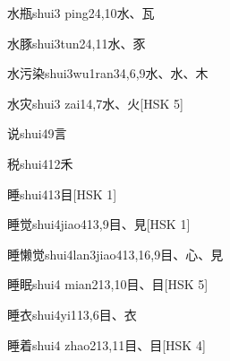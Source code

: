 \begin{entry}{水瓶}{shui3 ping2}{4,10}{⽔、⽡}
\end{entry}

\begin{entry}{水豚}{shui3tun2}{4,11}{⽔、⾗}
\end{entry}

\begin{entry}{水污染}{shui3wu1ran3}{4,6,9}{⽔、⽔、⽊}
\end{entry}

\begin{entry}{水灾}{shui3 zai1}{4,7}{⽔、⽕}[HSK 5]
\end{entry}

\begin{entry}{说}{shui4}{9}{⾔}
\end{entry}

\begin{entry}{税}{shui4}{12}{⽲}
\end{entry}

\begin{entry}{睡}{shui4}{13}{⽬}[HSK 1]
\end{entry}

\begin{entry}{睡觉}{shui4jiao4}{13,9}{⽬、⾒}[HSK 1]
\end{entry}

\begin{entry}{睡懒觉}{shui4lan3jiao4}{13,16,9}{⽬、⼼、⾒}
\end{entry}

\begin{entry}{睡眠}{shui4 mian2}{13,10}{⽬、⽬}[HSK 5]
\end{entry}

\begin{entry}{睡衣}{shui4yi1}{13,6}{⽬、⾐}
\end{entry}

\begin{entry}{睡着}{shui4 zhao2}{13,11}{⽬、⽬}[HSK 4]
\end{entry}


